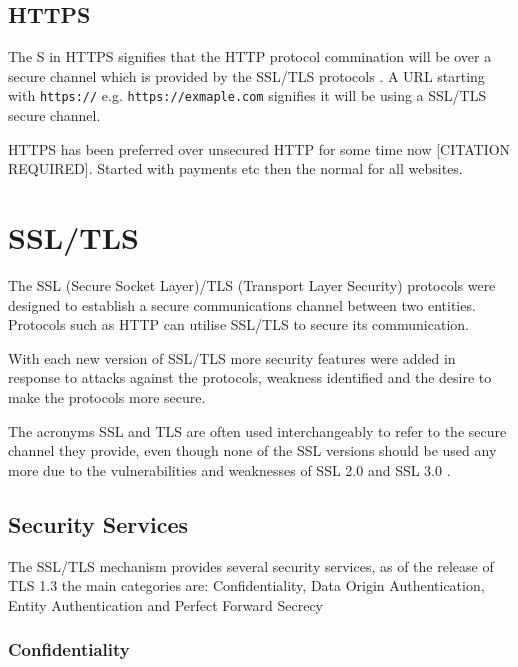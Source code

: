 \documentclass{mscreport}
\begin{document}
\subsection{HTTPS}

\noindent The S in HTTPS signifies that the HTTP protocol commination will be over a secure channel which is provided by the SSL/TLS protocols \cite{Rescorla2000-fs}. A URL starting with \texttt{https://} e.g. \texttt{https://exmaple.com} signifies it will be using a SSL/TLS secure channel.

\vspace{0.3cm}
\noindent HTTPS has been preferred over unsecured HTTP for some time now [CITATION REQUIRED].
Started with payments etc then the normal for all websites.

\newpage

\section{SSL/TLS}

\noindent The SSL (Secure Socket Layer)/TLS (Transport Layer Security) protocols were designed to establish a secure communications channel between two entities. Protocols such as HTTP can utilise SSL/TLS to secure its communication.

\vspace{0.3cm}
\noindent With each new version of SSL/TLS more security features were added in response to attacks against the protocols, weakness identified and the desire to make the protocols more secure.

\vspace{0.3cm}
\noindent The acronyms SSL and TLS are often used interchangeably to refer to the secure channel they provide, even though none of the SSL versions should be used any more due to the vulnerabilities and weaknesses of SSL 2.0 and SSL 3.0 \cite{Oppliger2016-ig}.

\subsection{Security Services}
\noindent The SSL/TLS mechanism provides several security services, as of the release of TLS 1.3 the main categories are: Confidentiality, Data Origin Authentication, Entity Authentication and Perfect Forward Secrecy

\subsubsection{Confidentiality}
\end{document}
